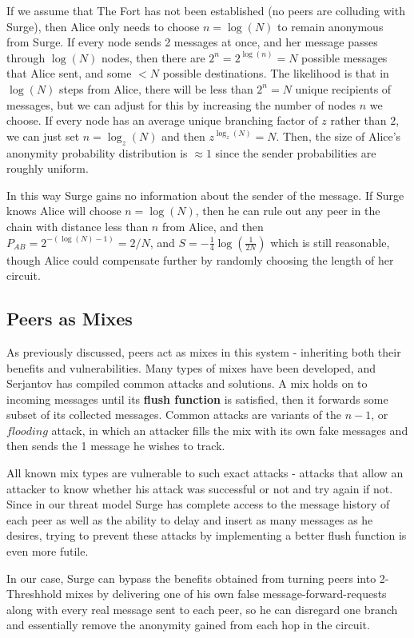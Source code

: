 \documentclass[twocolumn,11pt,english]{article}
\begin{document}
If we assume that The Fort has not been established (no peers are colluding with Surge), then Alice only needs to choose $n = \log(N)$ to remain anonymous from Surge. If every node sends 2 messages at once, and her message passes through $\log(N)$ nodes, then there are $2^n = 2^{\log(n)} = N$ possible messages that Alice sent, and some $< N$ possible destinations. The likelihood is that in $\log(N)$ steps from Alice, there will be less than $2^n = N$ unique recipients of messages, but we can adjust for this by increasing the number of nodes $n$ we choose. If every node has an average unique branching factor of $z$ rather than $2$, we can just set $n = \log_z(N)$ and then $z^{\log_z(N)} = N$. Then, the size of Alice's anonymity probability distribution is $\approx 1$ since the sender probabilities are roughly uniform.

In this way Surge gains no information about the sender of the message. If Surge knows Alice will choose $n = \log(N)$, then he can rule out any peer in the chain with distance less than $n$ from Alice, and then $P_{AB} = 2^{-(\log(N)-1)} = 2/N$, and $S = - \frac{1}{4} \log(\frac{1}{2N})$ which is still reasonable, though Alice could compensate further by randomly choosing the length of her circuit. 


\subsection{Peers as Mixes}
\label{sec:PeersAsMixes}
As previously discussed, peers act as mixes in this system - inheriting both their benefits and vulnerabilities. Many types of mixes have been developed, and Serjantov \cite{trickle02} has compiled common attacks and solutions. 
A mix holds on to incoming messages until its \textbf{flush function} is satisfied, then it forwards some subset of its collected messages. Common attacks are variants of the $n - 1$, or $flooding$ attack, in which an attacker fills the mix with its own fake messages and then sends the 1 message he wishes to track. 

All known mix types are vulnerable to such exact attacks \cite{trickle02} -  attacks that allow an attacker to know whether his attack was successful or not and try again if not. Since in our threat model Surge has complete access to the message history of each peer as well as the ability to delay and insert as many messages as he desires, trying to prevent these attacks by implementing a better flush function is even more futile. 

In our case, Surge can bypass the benefits obtained from turning peers into 2-Threshhold mixes by delivering one of his own false message-forward-requests along with every real message sent to each peer, so he can disregard one branch and essentially remove the anonymity gained from each hop in the circuit. 
\end{document}
